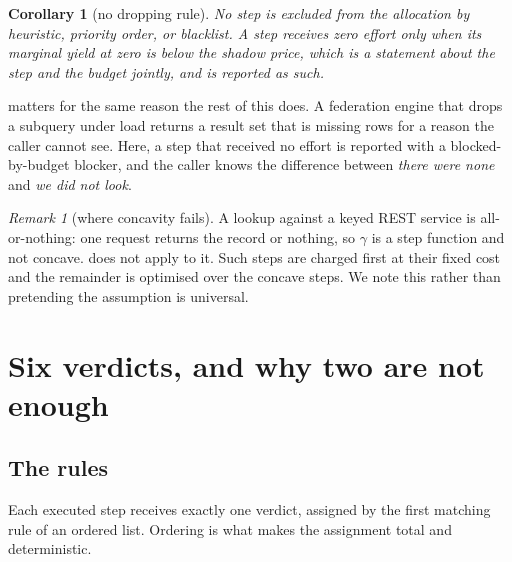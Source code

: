\documentclass[11pt,a4paper]{article}
\theoremstyle{plain}
\newtheorem{corollary}[theorem]{Corollary}
\theoremstyle{definition}
\theoremstyle{remark}
\newtheorem{remark}[theorem]{Remark}
\newcommand{\bbud}{\textsf{blocked-by-budget}}
\begin{document}
\begin{corollary}[no dropping rule]
\label{cor:nodrop}
No step is excluded from the allocation by heuristic, priority order, or
blacklist. A step receives zero effort only when its marginal yield at
zero is below the shadow price, which is a statement about the step and
the budget jointly, and is reported as such.
\end{corollary}

 matters for the same reason the rest of this does. A
federation engine that drops a subquery under load returns a result set
that is missing rows for a reason the caller cannot see. Here, a step
that received no effort is reported with a \bbud{} blocker, and the
caller knows the difference between \emph{there were none} and
\emph{we did not look}.

\begin{remark}[where concavity fails]
\label{rem:concavity}
A \textsf{lookup} against a keyed REST service is all-or-nothing: one
request returns the record or nothing, so $\gamma$ is a step function
and not concave.  does not apply to it. Such steps
are charged first at their fixed cost and the remainder is optimised
over the concave steps. We note this rather than pretending the
assumption is universal.
\end{remark}

\section{Six verdicts, and why two are not enough}
\label{sec:verdicts}

\subsection{The rules}

Each executed step receives exactly one verdict, assigned by the first
matching rule of an ordered list. Ordering is what makes the assignment
total and deterministic.
\end{document}
